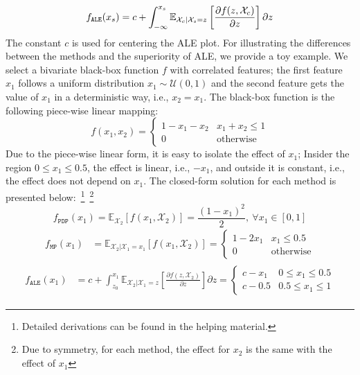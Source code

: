\documentclass[wcp]{jmlr}
\newcommand{\E}{\mathbb{E}} \newcommand{\Jac}{\mathbf{J}}
\begin{document}
\begin{gather}
  \label{eq:ALE} f_{\mathtt{ALE}}(x_s) = c + \int_{-\infty}^{x_s} \mathbb{E}_{\mathcal{X}_c|\mathcal{X}_s=z}\left[\frac{\partial f(z, \mathcal{X}_c)}{\partial z}\right] \partial z
\end{gather}
%
The constant \(c\) is used for centering the ALE plot. For illustrating the differences between the methods and the superiority of ALE, we provide a toy example. We select a bivariate black-box function \(f\) with correlated features; the first feature \( x_1 \) follows a uniform distribution \( x_1 \sim \mathcal{U}(0,1)\) and the second feature gets the value of \(x_1\) in a deterministic way, i.e., \( x_2 = x_1 \). The black-box function is the following piece-wise linear mapping:
%
\begin{equation} \label{eq:example-1-mapping} f(x_1, x_2) =
  \begin{cases} 1 - x_1 - x_2 & x_1 + x_2 \leq 1 \\ 0 & \text{otherwise}
  \end{cases}
\end{equation}
\noindent
%
Due to the piece-wise linear form, it is easy to isolate the effect of \(x_1\); Insider the region \(0 \leq x_1 \leq 0.5\), the effect is linear, i.e., \(-x_1\), and outside it is constant, i.e., the effect does not depend on \(x_1\). The closed-form solution for each method is presented below:~\footnote{Detailed derivations can be found in the helping material.}~\footnote{ Due to symmetry, for each method, the effect for \(x_2\) is the same with the effect of \(x_1\)}
%
\begin{equation}\label{eq:example-1-pdp} f_{\mathtt{PDP}}(x_1) = \mathbb{\E}_{\mathcal{X}_2} \left [f(x_1,\mathcal{X}_2) \right] = \frac{{(1-x_1)}^2}{2}, \: \forall x_1 \in [0,1]
\end{equation}
%
\begin{equation} \label{eq:example-1-mplots}
  \begin{split} f_{\mathtt{MP}}(x_1) &= \E_{\mathcal{X}_2|\mathcal{X}_1 = x_1} \left [ f(x_1, \mathcal{X}_2) \right] = \begin{cases} 1 - 2x_1 & x_1 \leq 0.5 \\ 0 &\text{otherwise}
    \end{cases}
  \end{split}
\end{equation}
%
\begin{align}\label{eq:example-1-ale}
  \begin{split} f_{\mathtt{ALE}}(x_1) &= c + \int_{z_0}^{x_1} \E_{\mathcal{X}_2|\mathcal{X}_1=z} \left [ \frac{\partial f(z, \mathcal{X}_2)}{\partial z} \right] \partial z =
     \begin{cases} c - x_1 & 0 \leq x_1 \leq 0.5\\ c - 0.5 & 0.5 \leq x_1 \leq 1
    \end{cases}
  \end{split}
\end{align}
\end{document}
